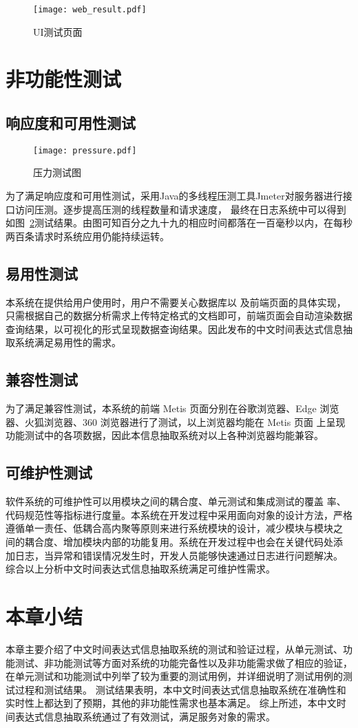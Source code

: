 \begin{figure}[h]
    \centering
    \texttt{[image: web\_result.pdf]}
    \caption{UI测试页面}
    \label{fig:web_result}
\end{figure}

\section{非功能性测试}

\subsection{响应度和可用性测试}

\begin{figure}[t]
    \centering
    \texttt{[image: pressure.pdf]}
    \caption{压力测试图}
    \label{fig:pressure}
\end{figure}

为了满足响应度和可用性测试，采用Java的多线程压测工具Jmeter对服务器进行接口访问压测。逐步提高压测的线程数量和请求速度，
最终在日志系统中可以得到如图~\ref{fig:pressure}测试结果。由图可知百分之九十九的相应时间都落在一百毫秒以内，在每秒两百条请求时系统应用仍能持续运转。


\subsection{易用性测试}

本系统在提供给用户使用时，用户不需要关心数据库以
及前端页面的具体实现，只需根据自己的数据分析需求上传特定格式的文档即可，前端页面会自动渲染数据查询结果，以可视化的形式呈现数据查询结果。因此发布的中文时间表达式信息抽取系统满足易用性的需求。

\subsection{兼容性测试}

为了满足兼容性测试，本系统的前端 Metis 页面分别在谷歌浏览器、Edge
浏览器、火狐浏览器、360 浏览器进行了测试，以上浏览器均能在 Metis 页面
上呈现功能测试中的各项数据，因此本信息抽取系统对以上各种浏览器均能兼容。

\subsection{可维护性测试}

软件系统的可维护性可以用模块之间的耦合度、单元测试和集成测试的覆盖
率、代码规范性等指标进行度量。本系统在开发过程中采用面向对象的设计方法，严格
遵循单一责任、低耦合高内聚等原则来进行系统模块的设计，减少模块与模块之
间的耦合度、增加模块内部的功能复用。系统在开发过程中也会在关键代码处添
加日志，当异常和错误情况发生时，开发人员能够快速通过日志进行问题解决。
综合以上分析中文时间表达式信息抽取系统满足可维护性需求。


\section{本章小结}

本章主要介绍了中文时间表达式信息抽取系统的测试和验证过程，从单元测试、功能测试、非功能测试等方面对系统的功能完备性以及非功能需求做了相应的验证，
在单元测试和功能测试中列举了较为重要的测试用例，并详细说明了测试用例的测试过程和测试结果。
测试结果表明，本中文时间表达式信息抽取系统在准确性和实时性上都达到了预期，其他的非功能性需求也基本满足。
综上所述，本中文时间表达式信息抽取系统通过了有效测试，满足服务对象的需求。